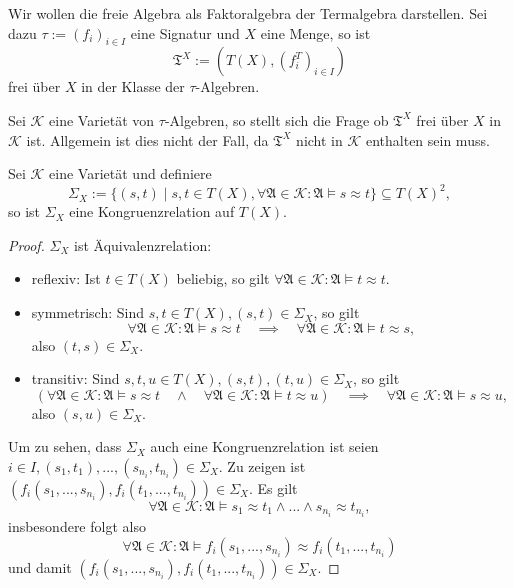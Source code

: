 \begin{remark}
    Wir wollen die freie Algebra als Faktoralgebra der Termalgebra darstellen. Sei dazu $\tau := (f_i)_{i \in I}$ eine Signatur und $X$ eine Menge, so ist
    $$ \mathfrak{T}^X := (T(X), (f_i^T)_{i \in I}) $$
    frei über $X$ in der Klasse der $\tau$-Algebren.

    Sei $\mathcal{K}$ eine Varietät von $\tau$-Algebren, so stellt sich die Frage ob $\mathfrak{T}^X$ frei über $X$ in $\mathcal{K}$ ist. Allgemein ist dies nicht der Fall, da $\mathfrak{T}^X$ nicht in $\mathcal{K}$ enthalten sein muss.
\end{remark}

\begin{proposition}
    Sei $\mathcal{K}$ eine Varietät und definiere
    $$ \Sigma_X := \{ (s, t) \mid s, t \in T(X), \forall \mathfrak{A} \in \mathcal{K}: \mathfrak{A} \models s \approx t \} \subseteq T(X)^2, $$
    so ist $\Sigma_X$ eine Kongruenzrelation auf $T(X)$.
\end{proposition}

\begin{proof}
    $\Sigma_X$ ist Äquivalenzrelation:
    \begin{itemize}
        \item reflexiv: Ist $t \in T(X)$ beliebig, so gilt $\forall \mathfrak{A} \in \mathcal{K}: \mathfrak{A} \models t \approx t$.
        \item symmetrisch: Sind $s, t \in T(X), (s,t) \in \Sigma_X$, so gilt
        $$ \forall \mathfrak{A} \in \mathcal{K}: \mathfrak{A} \models s \approx t \quad \implies \quad \forall \mathfrak{A} \in \mathcal{K}: \mathfrak{A} \models t \approx s, $$
        also $(t,s) \in \Sigma_X$.
        \item transitiv: Sind $s,t,u \in T(X), (s,t), (t,u) \in \Sigma_X$, so gilt
        $$ (\forall \mathfrak{A} \in \mathcal{K}: \mathfrak{A} \models s \approx t \quad \land \quad \forall \mathfrak{A} \in \mathcal{K}: \mathfrak{A} \models t \approx u) \quad \implies \quad \forall \mathfrak{A} \in \mathcal{K}: \mathfrak{A} \models s \approx u, $$
        also $(s,u) \in \Sigma_X$.
    \end{itemize}
    Um zu sehen, dass $\Sigma_X$ auch eine Kongruenzrelation ist seien $i \in I, (s_1, t_1), ..., (s_{n_i}, t_{n_i}) \in \Sigma_X$. Zu zeigen ist $(f_i(s_1, ..., s_{n_i}), f_i(t_1, ..., t_{n_i})) \in \Sigma_X$. Es gilt
    $$ \forall \mathfrak{A} \in \mathcal{K}: \mathfrak{A} \models s_1 \approx t_1 \land ... \land s_{n_i} \approx t_{n_i}, $$
    insbesondere folgt also
    $$ \forall \mathfrak{A} \in \mathcal{K}: \mathfrak{A} \models f_i(s_1, ..., s_{n_i}) \approx f_i(t_1, ..., t_{n_i}) $$
    und damit $(f_i(s_1, ..., s_{n_i}), f_i(t_1, ..., t_{n_i})) \in \Sigma_X$.
\end{proof}

